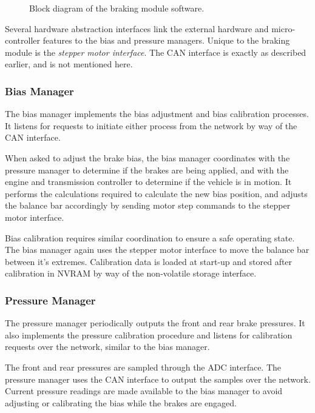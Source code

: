 \vspace{1em}
\begin{figure}[H]
	\centering
	
	\caption{Block diagram of the braking module software.}
	\label{fig:brake_software_design_block}
\end{figure}

Several hardware abstraction interfaces link the external hardware and micro-controller features to the bias and pressure managers. Unique to the braking module is the \emph{stepper motor interface}. The CAN interface is exactly as described earlier, and is not mentioned here.

\subsubsection{Bias Manager}

The bias manager implements the bias adjustment and bias calibration processes. It listens for requests to initiate either process from the network by way of the CAN interface.

When asked to adjust the brake bias, the bias manager coordinates with the pressure manager to determine if the brakes are being applied, and with the engine and transmission controller to determine if the vehicle is in motion. It performs the calculations required to calculate the new bias position, and adjusts the balance bar accordingly by sending motor step commands to the stepper motor interface.

Bias calibration requires similar coordination to ensure a safe operating state. The bias manager again uses the stepper motor interface to move the balance bar between it's extremes. Calibration data is loaded at start-up and stored after calibration in NVRAM by way of the non-volatile storage interface.

\subsubsection{Pressure Manager}

The pressure manager periodically outputs the front and rear brake pressures. It also implements the pressure calibration procedure and listens for calibration requests over the network, similar to the bias manager.

The front and rear pressures are sampled through the ADC interface. The pressure manager uses the CAN interface to output the samples over the network. Current pressure readings are made available to the bias manager to avoid adjusting or calibrating the bias while the brakes are engaged.

